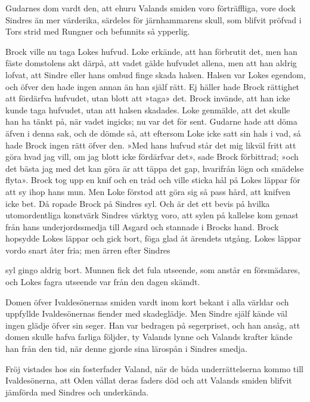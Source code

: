 Gudarnes dom vardt den, att ehuru Valands smiden voro förträffliga, vore
dock Sindres än mer värderika, särdeles för järnhammarens skull, som
blifvit pröfvad i Tors strid med Rungner och befunnits så ypperlig.

Brock ville nu taga Lokes hufvud. Loke erkände, att han förbrutit det,
men han fäste domstolens akt därpå, att vadet gälde hufvudet allena, men
att han aldrig lofvat, att Sindre eller hans ombud finge skada halsen.
Halsen var Lokes egendom, och öfver den hade ingen annan än han själf
rätt. Ej häller hade Brock rättighet att fördärfva hufvudet, utan blott
att »taga» det. Brock invände, att han icke kunde taga hufvudet, utan
att halsen skadades. Loke genmälde, att det skulle han ha tänkt på, när
vadet ingicks; nu var det för sent. Gudarne hade att döma äfven i denna
sak, och de dömde så, att eftersom Loke icke satt sin hals i vad, så
hade Brock ingen rätt öfver den. »Med hans hufvud står det mig likväl
fritt att göra hvad jag vill, om jag blott icke fördärfvar det», sade
Brock förbittrad; »och det bästa jag med det kan göra är att täppa det
gap, hvarifrån lögn och smädelse flyta». Brock tog upp en knif och en
tråd och ville sticka hål på Lokes läppar för att sy ihop hans mun. Men
Loke förstod att göra sig så pass hård, att knifven icke bet. Då ropade
Brock på Sindres syl. Och är det ett bevis på hvilka utomordentliga
konstvärk Sindres värktyg voro, att sylen på kallelse kom genast från
hans underjordssmedja till Asgard och stannade i Brocks hand. Brock
hopsydde Lokes läppar och gick bort, föga glad åt ärendets utgång. Lokes
läppar vordo snart åter fria; men ärren efter Sindres

syl gingo aldrig bort. Munnen fick det fula utseende, som anstår en
försmädares, och Lokes fagra utseende var från den dagen skämdt.

Domen öfver Ivaldesönernas smiden vardt inom kort bekant i alla världar
och uppfyllde Ivaldesönernas fiender med skadeglädje. Men Sindre själf
kände väl ingen glädje öfver sin seger. Han var bedragen på segerpriset,
och han ansåg, att domen skulle hafva farliga följder, ty Valands lynne
och Valands krafter kände han från den tid, när denne gjorde sina
lärospån i Sindres smedja.



Fröj vistades hos sin fosterfader Valand, när de båda underrättelserna
kommo till Ivaldesönerna, att Oden vållat deras faders död och att
Valands smiden blifvit jämförda med Sindres och underkända.

